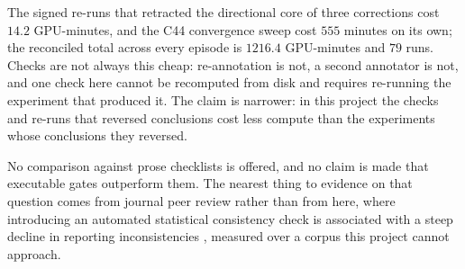 The signed re-runs that retracted the directional core of three corrections cost
$14.2$ GPU-minutes, and the C44 convergence sweep cost $555$ minutes on its own; the
reconciled total across every episode is $1216.4$ GPU-minutes and $79$
runs. Checks are not always this cheap: re-annotation
is not, a second annotator is not, and one check here cannot be
recomputed from disk and requires re-running the experiment that produced
it. The claim is narrower: in this project the checks and re-runs that reversed
conclusions cost less compute than the experiments whose conclusions they
reversed.

No comparison against prose checklists is offered, and no claim is made that
executable gates outperform them. The nearest thing to evidence on that
question comes from journal peer review rather than from here, where
introducing an automated statistical consistency check is associated with a
steep decline in reporting inconsistencies \citep{nuijten2023statcheck},
measured over a corpus this project cannot approach.


